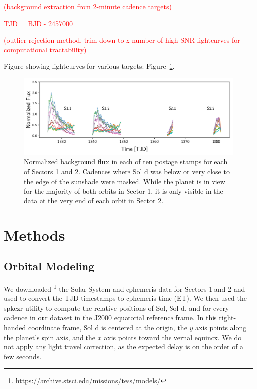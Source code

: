 \documentclass[modern]{aastex62}
\newcommand{\todo}[1]{\textcolor{red}{#1}}
\begin{document}
\todo{(background extraction from 2-minute cadence targets)}

\todo{TJD = BJD - 2457000}

\todo{(outlier rejection method, trim down to x number of high-SNR lightcurves 
for computational tractability)}

Figure showing lightcurves for various targets: Figure~\ref{fig:data}.

\begin{figure}[ht!]
    \begin{centering}
    \includegraphics[width=\linewidth]{figures/data.pdf}
    \caption{\label{fig:data}
             Normalized background flux in each of ten postage stamps
             for each of Sectors 1 and 2. Cadences where Sol d was
             below or very close to the edge of the sunshade were masked.
             While the planet is in view for the majority of both orbits
             in Sector 1, it is only visible in the data at the very end
             of each orbit in Sector 2.
             }
    \end{centering}
\end{figure}

\section{Methods}
\label{sec:methods}

\subsection{Orbital Modeling}

We downloaded 
\footnote{\url{https://archive.stsci.edu/missions/tess/models/}}
the Solar System and \tess ephemeris data for
Sectors 1 and 2 and used \spiceypy \citep{Acton1996, Acton2017, Annex2017}
to convert the TJD timestamps to 
ephemeris time (ET). We then used the \textsf{spkezr} utility to compute
the relative positions of Sol, Sol d, and \tess for every cadence
in our dataset in the J2000 equatorial reference frame. In this right-handed
coordinate frame, Sol d is centered at the origin, the $y$ axis points along the 
planet's spin axis, and the $x$ axis points toward the vernal equinox. We
do not apply any light travel correction, as the expected delay is on the order
of a few seconds.
\end{document}
